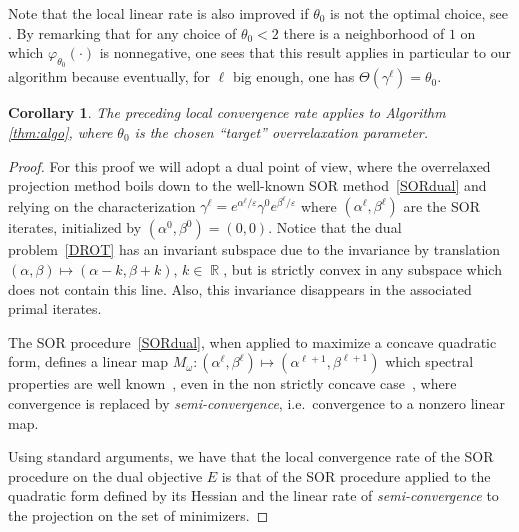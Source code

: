 \documentclass{article} %
\DeclareMathOperator{\IR}{\mathbb{R}}
\renewcommand{\epsilon}{\varepsilon}
\theoremstyle{plain}
\newtheorem{corollary}{Corollary}
\theoremstyle{definition}
\theoremstyle{remark}
\begin{document}
Note that the local linear rate is also improved if $\theta_0$ is not the optimal choice, see \cite[chapter 5]{ciarlet1982introduction}. By remarking that for any choice of $\theta_0<2$ there is a neighborhood of $1$ on which $\varphi_{\theta_0}(\cdot)$ is nonnegative, one sees that this result applies in particular to our algorithm because eventually, for $\ell$ big enough, one has $\Theta(\gamma^\ell)=\theta_0$.
\begin{corollary}
The preceding local convergence rate applies to Algorithm \ref{thm:algo}, where $\theta_0$ is the chosen ``target'' overrelaxation parameter.
\end{corollary}
\begin{proof}
For this proof we will adopt a dual point of view, where the overrelaxed projection method boils down to the well-known SOR method~\eqref{SORdual} and relying on the characterization $\gamma^{\ell}=e^{\alpha^\ell/\epsilon}\gamma^0 e^{\beta^\ell/\epsilon}$ where $(\alpha^\ell,\beta^\ell)$ are the SOR iterates, initialized by $(\alpha^0,\beta^0)=(0,0)$. Notice that the dual problem~\eqref{DROT} has an invariant subspace due to the invariance by translation $(\alpha,\beta)\mapsto (\alpha-k,\beta+k)$, $k\in \IR$, but is strictly convex in any subspace which does not contain this line. Also, this invariance disappears in the associated primal iterates. 

The SOR procedure~\eqref{SORdual}, when applied to maximize a concave quadratic form, defines a linear map $M_\omega : (\alpha^{\ell},\beta^{\ell})\mapsto (\alpha^{\ell+1},\beta^{\ell+1})$ which spectral properties are well known~\cite{ciarlet1982introduction, young2014iterative}, even in the non strictly concave case~\cite{hadjidimos1985optimization}, where convergence is replaced by \emph{semi-convergence}, i.e.\ convergence to a nonzero linear map.

Using standard arguments, we have that the local convergence rate of the SOR procedure on the dual objective $E$ is that of the SOR procedure applied to the quadratic form defined by its Hessian and the linear rate of \emph{semi-convergence} to the projection on the set of minimizers. 
\end{proof}

\end{document}
